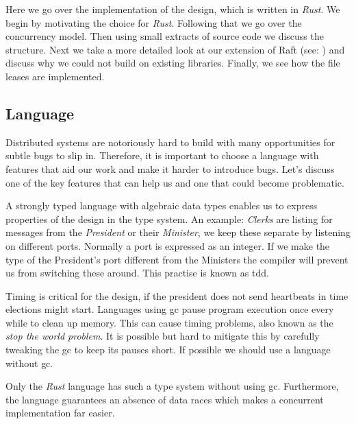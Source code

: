 Here we go over the implementation of the design, which is written in \textit{Rust}. We begin by motivating the choice for \textit{Rust}. Following that we go over the concurrency model. Then using small extracts of source code we discuss the structure. Next we take a more detailed look at our extension of Raft (see: ) and discuss why we could not build on existing libraries. Finally, we see how the file leases are implemented.

\subsection{Language}
Distributed systems are notoriously hard to build with many opportunities for subtle bugs to slip in. Therefore, it is important to choose a language with features that aid our work and make it harder to introduce bugs. Let's discuss one of the key features that can help us and one that could become problematic.

A strongly typed language with algebraic data types enables us to express properties of the design in the type system. An example: \textit{Clerks} are listing for messages from the \textit{President} or their \textit{Minister}, we keep these separate by listening on different ports. Normally a port is expressed as an integer. If we make the type of the President's port different from the Ministers the compiler will prevent us from switching these around. This practise is known as \ac{tdd}.

Timing is critical for the design, if the president does not send heartbeats in time elections might start. Languages using \ac{gc} pause program execution once every while to clean up memory. This can cause timing problems, also known as the \textit{stop the world problem}. It is possible but hard to mitigate this by carefully tweaking the \ac{gc} to keep its pauses short. If possible we should use a language without \ac{gc}.

Only the \textit{Rust} language has such a type system without using \ac{gc}. Furthermore, the language guarantees an absence of data races which makes a concurrent implementation far easier.

